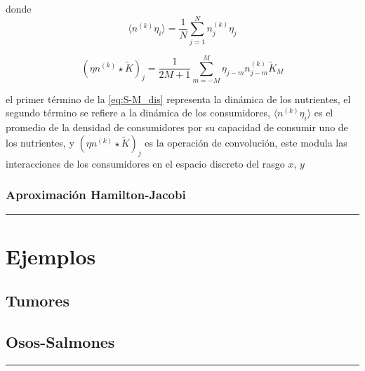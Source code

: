 \documentclass[letterpaper]{article}
\begin{document}
{    donde 
    \begin{equation*}
        \langle{n^{(k)}\eta_{i}}\rangle = \frac{1}{N}\sum_{j=1}^{N}n_{j}^{(k)}\eta_{j}
    \end{equation*}

    \begin{equation*}
        (\eta n^{(k)}\star \tilde{K})_{j}=\frac{1}{2M+1}\sum_{m=-M}^{M}\eta_{j-m}n_{j-m}^{(k)}\tilde{K}_{M}
    \end{equation*}

    el primer término de la \eqref{eq:S-M_dis} representa la dinámica de los nutrientes, el segundo término se refiere a la dinámica de los consumidores, $\langle{n^{(k)}\eta_{i}}\rangle$ es el promedio de la densidad de consumidores por su capacidad de consumir uno de los nutrientes, y $(\eta n^{(k)}\star \tilde{K})_{j}$ es la operación de convolución, este modula las interacciones de los consumidores en el espacio discreto del rasgo $x$, $y$

    \subsubsection{Aproximación Hamilton-Jacobi}


    }

    \vspace{0.2cm}
        \rule{150mm}{0.5mm} %
    \vspace{0.2cm}

    \section{Ejemplos}{

        \subsection{Tumores}

        \subsection{Osos-Salmones}
    
    }

    \vspace{0.2cm}
        \rule{150mm}{0.5mm} %
    \vspace{0.2cm}
\end{document}
